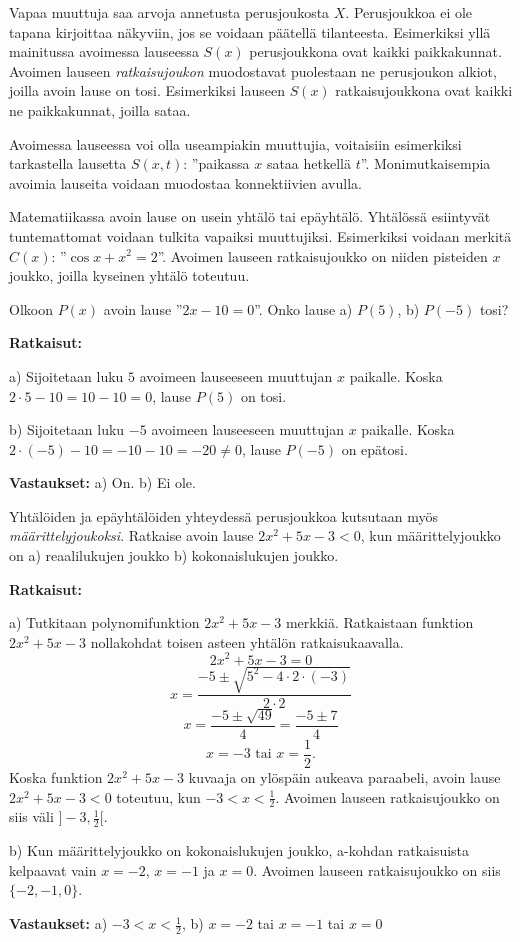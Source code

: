 Vapaa muuttuja saa arvoja annetusta perusjoukosta $X$. Perusjoukkoa ei ole tapana kirjoittaa näkyviin, jos se voidaan päätellä tilanteesta. Esimerkiksi yllä mainitussa avoimessa lauseessa $S(x)$ perusjoukkona ovat kaikki paikkakunnat. Avoimen lauseen {\em ratkaisujoukon} muodostavat puolestaan ne perusjoukon alkiot, joilla avoin lause on tosi. Esimerkiksi lauseen $S(x)$ ratkaisujoukkona ovat kaikki ne paikkakunnat, joilla sataa.

Avoimessa lauseessa voi olla useampiakin muuttujia, voitaisiin esimerkiksi tarkastella lausetta $S(x,t)$: ''paikassa $x$ sataa hetkellä $t$''. Monimutkaisempia avoimia lauseita voidaan muodostaa konnektiivien
avulla.

Matematiikassa avoin lause on usein yhtälö tai epäyhtälö. Yhtälössä esiintyvät tuntemattomat voidaan tulkita vapaiksi muuttujiksi. Esimerkiksi voidaan merkitä $C(x)$: ''$\cos x + x^2= 2$''. Avoimen lauseen ratkaisujoukko on niiden pisteiden $x$ joukko, joilla kyseinen yhtälö toteutuu.

\begin{esimerkki}
Olkoon $P(x)$ avoin lause ''$2x - 10 = 0$''. Onko lause a) $P(5)$, b) $P(-5)$ tosi?

{\bf Ratkaisut:}

a) Sijoitetaan luku $5$ avoimeen lauseeseen muuttujan $x$ paikalle. Koska $2\cdot 5 - 10 = 10 - 10 = 0$, lause $P(5)$ on tosi.

b) Sijoitetaan luku $-5$ avoimeen lauseeseen muuttujan $x$ paikalle. Koska $2\cdot(-5) - 10 = -10 - 10 = -20 \neq 0$, lause $P(-5)$ on epätosi.

{\bf Vastaukset:} a) On. b) Ei ole.
\end{esimerkki}

\begin{esimerkki}
Yhtälöiden ja epäyhtälöiden yhteydessä perusjoukkoa kutsutaan myös {\em määrittelyjoukoksi}. Ratkaise avoin lause $2x^2 + 5x - 3 < 0$, kun määrittelyjoukko on a) reaalilukujen joukko b) kokonaislukujen joukko.

{\bf Ratkaisut:}

a) Tutkitaan polynomifunktion $2x^2 + 5x - 3$ merkkiä. Ratkaistaan funktion $2x^2 + 5x - 3$ nollakohdat toisen asteen yhtälön ratkaisukaavalla.
\[
2x^2 + 5x - 3 = 0
\]
\[
x =\frac{-5\pm\sqrt{5^2-4\cdot 2\cdot(-3)}}{2\cdot 2}
\] 
\[
x = \frac{-5\pm\sqrt{49}}{4} =\frac{-5\pm 7}{4}
\]
\[
x = -3\textrm{  tai  }x =\frac{1}{2}.
\]
Koska funktion $2x^2 + 5x - 3$ kuvaaja on ylöspäin aukeava paraabeli, avoin lause $2x^2 + 5x - 3 < 0$ toteutuu, kun $-3 < x < \frac{1}{2}$. Avoimen lauseen ratkaisujoukko on siis väli $]-3, \frac{1}{2}[$.

b) Kun määrittelyjoukko on kokonaislukujen joukko, a-kohdan ratkaisuista kelpaavat vain $x = -2$, $x = -1$ ja $x = 0$. Avoimen lauseen ratkaisujoukko on siis $\{-2, -1, 0\}$.

{\bf Vastaukset:} a) $-3 < x < \frac{1}{2}$, b) $x = -2$ tai $x = -1$ tai $x = 0$
\end{esimerkki}

